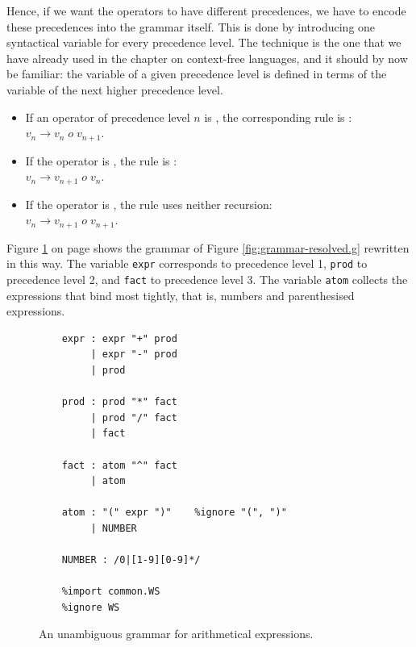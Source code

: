 Hence, if we want the operators to have different precedences, we have to encode these precedences into the
grammar itself.  This is done by introducing one syntactical variable for every precedence level.
The technique is the one that we have already used in the chapter on context-free languages, and it should by
now be familiar: the variable of a given precedence level is defined in terms of the variable of the next
higher precedence level.
\begin{itemize}
\item If an operator of precedence level $n$ is , the corresponding rule is
      :
      \\[0.2cm]
      \hspace*{1.3cm}
      $v_n \rightarrow v_n \;o\; v_{n+1}$.
\item If the operator is , the rule is :
      \\[0.2cm]
      \hspace*{1.3cm}
      $v_n \rightarrow v_{n+1} \;o\; v_n$.
\item If the operator is , the rule uses neither recursion:
      \\[0.2cm]
      \hspace*{1.3cm}
      $v_n \rightarrow v_{n+1} \;o\; v_{n+1}$.
\end{itemize}
Figure \ref{fig:grammar-layered} on page \pageref{fig:grammar-layered} shows the grammar of Figure
\ref{fig:grammar-resolved.g} rewritten in this way.  The variable \texttt{expr} corresponds to precedence level
1, \texttt{prod} to precedence level 2, and \texttt{fact} to precedence level 3.  The variable \texttt{atom}
collects the expressions that bind most tightly, that is, numbers and parenthesised expressions.

\begin{figure}[!ht]
\centering
\begin{verbatim}
    expr : expr "+" prod
         | expr "-" prod
         | prod

    prod : prod "*" fact
         | prod "/" fact
         | fact

    fact : atom "^" fact
         | atom

    atom : "(" expr ")"    %ignore "(", ")"
         | NUMBER

    NUMBER : /0|[1-9][0-9]*/

    %import common.WS
    %ignore WS
\end{verbatim}
\vspace*{-0.3cm}
\caption{An unambiguous  grammar for arithmetical expressions.}
\label{fig:grammar-layered}
\end{figure}
\FloatBarrier

